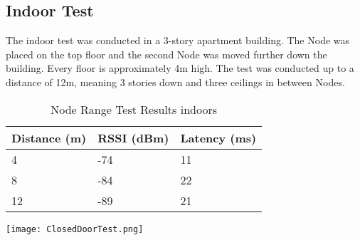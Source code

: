     \subsection{Indoor Test}
    The indoor test was conducted in a 3-story apartment building.
    The Node was placed on the top floor and the second Node was
    moved further down the building. Every floor is approximately
    4m high. The test was conducted up to a distance of 12m, meaning 
    3 stories down and three ceilings in between Nodes.
    \vspace{1cm}

    \begin{table}[H]
        \centering
        \begin{minipage}{0.40\textwidth} %
            \centering
            \begin{tabular}{|p{2cm}|p{1.6cm}|p{1.6cm}|}
                \hline
                \textbf{Distance (m)} & \textbf{RSSI (dBm)} & \textbf{Latency (ms)} \\ \hline
                4   & -74 & 11 \\ \hline
                8   & -84 & 22 \\ \hline
                12  & -89 & 21 \\ \hline
            \end{tabular}
            \label{tab:node_range_test}
        \end{minipage}%
        \hfill %
        \begin{minipage}{0.55\textwidth} %
            \centering
            \texttt{[image: ClosedDoorTest.png]}
            \label{fig:node_range_test}
        \end{minipage}
        \caption{Node Range Test Results indoors}
    \end{table}

